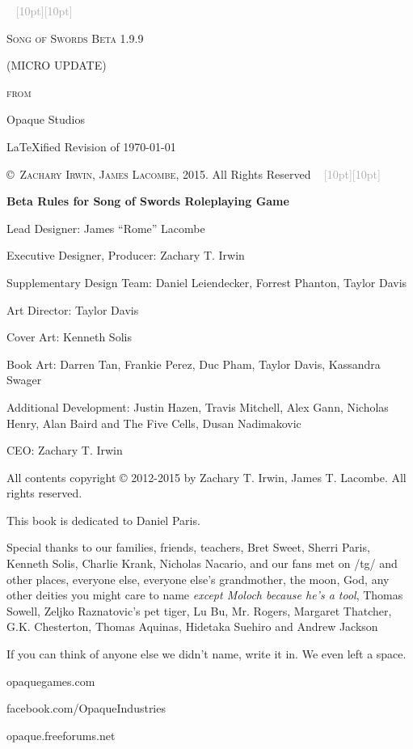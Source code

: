 \documentclass[oneside,11pt,english]{book}
\newcommand{\ornamento}{\vspace{2em}\noindent \textcolor{darkgray}{\hrulefill~ \raisebox{-2.5pt}[10pt][10pt]{\leafright \decofourleft \decothreeleft  \aldineright \decotwo \floweroneleft \decoone   \floweroneright \decotwo \aldineleft\decothreeright \decofourright \leafleft} ~  \hrulefill \linebreak \vspace{2em}}}
\begin{document}
\frontmatter

\begin{titlepage}
\pagestyle{empty}
	\centering
	\ornamento\\
	{\scshape\huge Song of Swords Beta 1.9.9\par}
	\vspace{0.8cm}
	{\scshape\Large{(MICRO UPDATE)}\par \scshape\Large{from} \par}
	\vspace{0.1 cm}
	{\huge Opaque Studios \par}
	\vfill
	{\huge\LaTeX ified Revision of \today}\par
	\vspace{0.2 cm}
	 \textsc{\copyright~Zachary Irwin, James Lacombe}, 2015. All Rights Reserved
	 \ornamento
\end{titlepage}
\newpage
\begin{center}
\vfill
\textbf{Beta Rules for Song of Swords Roleplaying Game}\par
Lead Designer: James “Rome” Lacombe\par
Executive Designer, Producer: Zachary T. Irwin\par
Supplementary Design Team: Daniel Leiendecker, Forrest Phanton, Taylor Davis\par
Art Director: Taylor Davis\par
Cover Art: Kenneth Solis\par
Book Art: Darren Tan, Frankie Perez, Duc Pham, Taylor Davis, Kassandra Swager\par


Additional Development: Justin Hazen, Travis Mitchell, Alex Gann, Nicholas Henry, Alan Baird and The Five Cells, Dusan Nadimakovic\par
CEO: Zachary T. Irwin\par


All contents copyright © 2012-2015 by Zachary T. Irwin, James T. Lacombe. All rights reserved.


This book is dedicated to Daniel Paris.
\vfill

Special thanks to our families, friends, teachers, Bret Sweet, Sherri Paris, Kenneth Solis, Charlie Krank, Nicholas Nacario, and our fans met on /tg/ and other places, everyone else, everyone else’s grandmother, the moon, God, any other deities you might care to name \textit{except Moloch because he’s a tool}, Thomas Sowell, Zeljko Raznatovic’s pet tiger, Lu Bu, Mr. Rogers, Margaret Thatcher, G.K. Chesterton, Thomas Aquinas, Hidetaka Suehiro and Andrew Jackson

\vspace{1cm}
If you can think of anyone else we didn’t name, write it in. We even left a space. 

\vfill
opaquegames.com\par
facebook.com/OpaqueIndustries\par
opaque.freeforums.net\par
\end{center}
\clearpage
\tableofcontents %
\mainmatter
\end{document}
